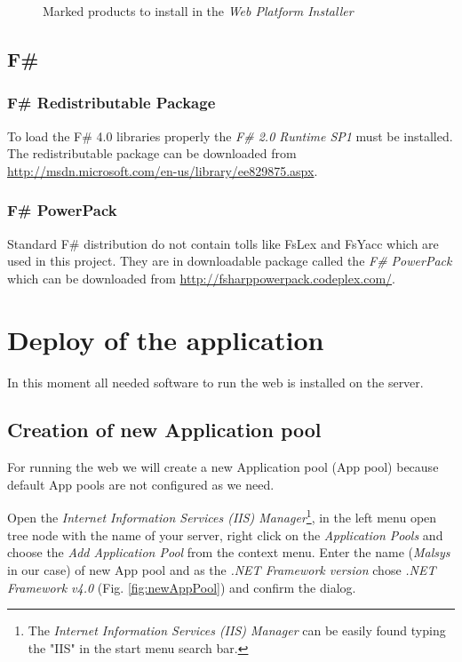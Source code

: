\begin{figure}[h!]
	\centering
	\caption{Marked products to install in the \emph{Web Platform Installer}}
	\label{fig:wpi}
\end{figure}
		
		

\subsection{F\#}

\subsubsection{F\# Redistributable Package}

To load the F\# 4.0 libraries properly the \emph{F\# 2.0 Runtime SP1} must be installed.
The redistributable package can be downloaded from \url{http://msdn.microsoft.com/en-us/library/ee829875.aspx}.

\subsubsection{F\# PowerPack}

Standard F\# distribution do not contain tolls like FsLex and FsYacc which are used in this project.
They are in downloadable package called the \emph{F\# PowerPack} which can be downloaded from \url{http://fsharppowerpack.codeplex.com/}.


\section{Deploy of the application}

In this moment all needed software to run the web is installed on the server.


\subsection{Creation of new Application pool}

For running the web we will create a new Application pool (App pool) because default App pools are not configured as we need.

Open the \emph{Internet Information Services (IIS) Manager}\footnote{The \emph{Internet Information Services (IIS) Manager} can be easily found typing the "IIS" in the start menu search bar.}, in the left menu open tree node with the name of your server, right click on the \emph{Application Pools} and choose the \emph{Add Application Pool} from the context menu.
Enter the name (\emph{Malsys} in our case) of new App pool and as the \emph{.NET Framework version} chose \emph{.NET Framework v4.0} (Fig. \ref{fig:newAppPool}) and confirm the dialog.

